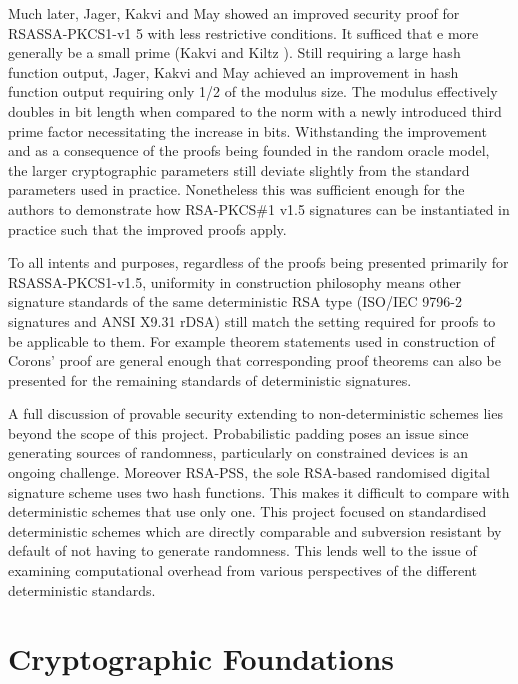 \documentclass[]{final_report}
\theoremstyle{definition}
\begin{document}
Much later, Jager, Kakvi and May \cite{jager2018security} showed an improved security proof for RSASSA-PKCS1-v1 5 with less restrictive conditions.
It sufficed that e more generally be a small prime (Kakvi and Kiltz \cite{kakvi2018optimal}). Still requiring a large hash function output, Jager, Kakvi and May achieved an improvement in hash function output requiring only 1/2 of the modulus size. The modulus effectively doubles in bit length when compared to the norm with a newly introduced third prime factor necessitating the increase in bits.
Withstanding the improvement and as a consequence of the proofs being founded in the random oracle model, the larger cryptographic parameters still deviate slightly from the standard parameters used in practice. Nonetheless this was sufficient enough for the authors to demonstrate how RSA-PKCS\#1 v1.5 signatures can be instantiated in practice such that the improved proofs apply. 

To all intents and purposes, regardless of the proofs being presented primarily for RSASSA-PKCS1-v1.5, uniformity in construction philosophy means other signature standards of the same deterministic RSA type (ISO/IEC 9796-2 signatures and ANSI X9.31 rDSA) still match the setting required for proofs to be applicable to them. For example theorem statements used in construction of Corons' proof \cite{coron2002security} are general enough that corresponding proof theorems can also be presented for the remaining standards of deterministic signatures. 

A full discussion of provable security extending to non-deterministic schemes lies beyond the scope of this project. Probabilistic padding poses an issue since generating sources of randomness, particularly on constrained devices is an ongoing challenge. Moreover RSA-PSS, the sole RSA-based randomised digital signature scheme uses two hash functions. This makes it difficult to compare with deterministic schemes that use only one. This project focused on standardised deterministic schemes which are directly comparable and subversion resistant \cite{ateniese2015subversion} by default of not having to generate randomness. This lends well to the issue of examining computational overhead from various perspectives of the different deterministic standards.



\chapter{Cryptographic Foundations}
\end{document}
